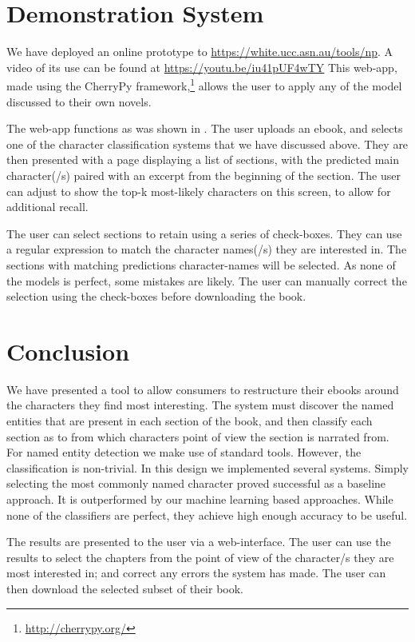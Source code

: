 \documentclass[11pt,a4paper]{article}
\begin{document}
\section{Demonstration System}\label{sec:demonstration}
We have deployed an online prototype to \url{https://white.ucc.asn.au/tools/np}.
A video of its use can be found at \url{https://youtu.be/iu41pUF4wTY}
This web-app, made using the CherryPy framework,\footnote{\url{http://cherrypy.org/}}
allows the user to apply any of the model discussed to their own novels.

The web-app functions as was shown in .
The user uploads an ebook, and selects one of the character classification systems that we have discussed above.
They are then presented with a page displaying a list of sections,
with the predicted main character(/s) paired with an excerpt from the beginning of the section.
The user can adjust to show the top-k most-likely characters on this screen, to allow for additional recall.

The user can select sections to retain using a series of check-boxes.
They can use a regular expression to match the character names(/s) they are interested in.
The sections with matching predictions character-names will be selected.
As none of the models is perfect, some mistakes are likely.
The user can manually correct the selection using the check-boxes before downloading the book.



\section{Conclusion}\label{sec:conclusion}
We have presented a tool to allow consumers to restructure their ebooks around the characters they find most interesting.
The system must discover the named entities that are present in each section of the book,
and then classify each section as to from which characters point of view the section is narrated from.
For named entity detection we make use of standard tools.
However, the classification is non-trivial.
In this design we implemented several systems.
Simply selecting the most commonly named character proved successful as a baseline approach.
It is outperformed by our machine learning based  approaches.
While none of the classifiers are perfect,
they achieve high enough accuracy to be useful.



The results are presented to the user via a web-interface.
The user can use the results to select the chapters from the point of view of the character/s they are most interested in;
and correct any errors the system has made.
The user can then download the selected subset of their book.
\end{document}
